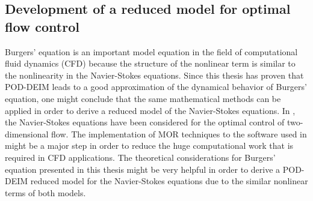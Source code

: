 \subsection*{Development of a reduced model for optimal flow control}
Burgers' equation is an important model equation in the field of computational fluid dynamics (CFD) because the structure of the nonlinear term is similar to the nonlinearity in the Navier-Stokes equations. Since this thesis has proven that POD-DEIM leads to a good approximation of the dynamical behavior of Burgers' equation, one might conclude that the same mathematical methods can be applied in order to derive a reduced model of the Navier-Stokes equations. In \cite{MS07,RT07}, the Navier-Stokes equations have been considered for the optimal control of two-dimensional flow. The implementation of MOR techniques to the software used in \cite{MS07,RT07} might be a major step in order to reduce the huge computational work that is required in CFD applications. The theoretical considerations for Burgers' equation presented in this thesis might be very helpful in order to derive a POD-DEIM reduced model for the Navier-Stokes equations due to the similar nonlinear terms of both models.
